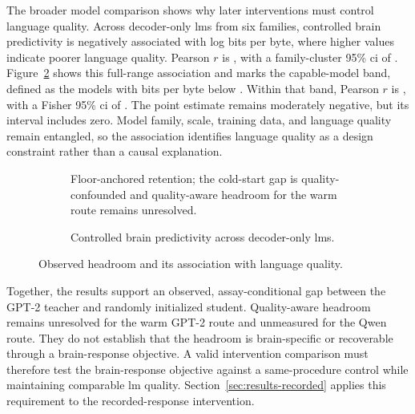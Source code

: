 The broader model comparison shows why later interventions must control language quality.
Across  decoder-only \acp{lm} from six families, controlled brain predictivity is negatively associated with log bits per byte, where higher values indicate poorer language quality.
Pearson \(r\) is , with a family-cluster 95\% \ac{ci} of .
Figure~\ref{fig:distillation-headroom-quality} shows this full-range association and marks the capable-model band, defined as the  models with bits per byte below .
Within that band, Pearson \(r\) is , with a Fisher 95\% \ac{ci} of .
The point estimate remains moderately negative, but its interval includes zero.
Model family, scale, training data, and language quality remain entangled, so the association identifies language quality as a design constraint rather than a causal explanation.

\begin{figure}[H]
  \centering
  \begin{subfigure}[t]{\textwidth}
    \centering
    \resizebox{\linewidth}{!}{}
    \par\vspace{0.45em}
    \caption{Floor-anchored retention; the cold-start gap is quality-confounded and quality-aware headroom for the warm route remains unresolved.}
    \label{fig:distillation-headroom-retention}
  \end{subfigure}
  \par\smallskip
  \begin{subfigure}[t]{\textwidth}
    \centering
    \resizebox{\linewidth}{!}{}
    \par\vspace{0.45em}
    \caption{Controlled brain predictivity across  decoder-only \acp{lm}.}
    \label{fig:distillation-headroom-quality}
  \end{subfigure}
  \caption{Observed headroom and its association with language quality.}
  \label{fig:distillation-headroom-quality-results}
\end{figure}
\FloatBarrier

Together, the results support an observed, assay-conditional gap between the GPT-2 teacher and randomly initialized student.
Quality-aware headroom remains unresolved for the warm GPT-2 route and unmeasured for the Qwen route.
They do not establish that the headroom is brain-specific or recoverable through a brain-response objective.
A valid intervention comparison must therefore test the brain-response objective against a same-procedure control while maintaining comparable \ac{lm} quality.
Section~\ref{sec:results-recorded} applies this requirement to the recorded-response intervention.

